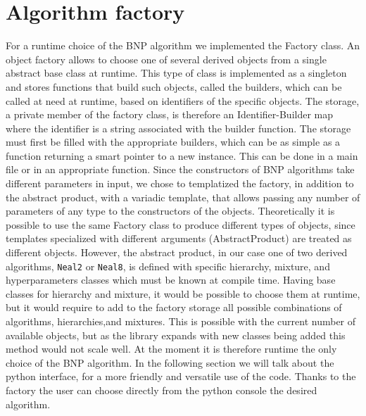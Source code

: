 \section{Algorithm factory}
For a runtime choice of the BNP algorithm we implemented the Factory class.
An object factory allows to choose one of several derived objects from a single abstract base class at runtime.  This type of class is implemented as a singleton and stores functions that build such objects, called the builders, which can be called at need at runtime, based on identifiers of the specific objects. The storage, a private member of the factory class, is therefore an Identifier-Builder map where the identifier is a string associated with the builder function.
 The storage must first be filled with the appropriate builders, which can be as simple as a function returning a smart pointer to a new instance. This can be done in a main file or in an appropriate function.
Since the constructors of BNP algorithms take different parameters in input, we chose to templatized the factory, in addition to the abstract product, with a variadic template, that allows passing any number of parameters of any type to the constructors of the objects.
Theoretically it is possible to use the same Factory class to produce different types of objects, since templates specialized with different arguments (AbstractProduct) are treated as different objects.
However, the abstract product, in our case one of two derived algorithms, \verb|Neal2| or \verb|Neal8|, is defined with specific hierarchy, mixture, and hyperparameters classes which must be known at compile time. Having base classes for hierarchy and mixture, it would be possible to choose them at runtime, but it would require to add to the factory storage all possible combinations of algorithms, hierarchies,and mixtures.
This is possible with the current number of available objects, but as the library expands with new classes being added this method would not scale well.
At the moment it is therefore runtime the only choice of the BNP algorithm.
In the following section we will talk about the python interface, for a more friendly and versatile use of the code. Thanks to the factory the user can choose directly from the python console the desired algorithm.
